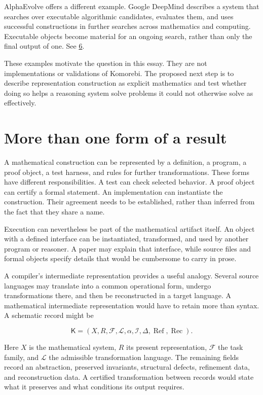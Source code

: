 \documentclass[11pt,oneside,openany]{book}
\begin{document}
AlphaEvolve offers a different example. Google DeepMind describes a system that searches over executable algorithmic candidates, evaluates them, and uses successful constructions in further searches across mathematics and computing. Executable objects become material for an ongoing search, rather than only the final output of one. See \hyperlink{reference-6}{6}.

These examples motivate the question in this essay. They are not implementations or validations of Komorebi. The proposed next step is to describe representation construction as explicit mathematics and test whether doing so helps a reasoning system solve problems it could not otherwise solve as effectively.

\section{More than one form of a result}
A mathematical construction can be represented by a definition, a program, a proof object, a test harness, and rules for further transformations. These forms have different responsibilities. A test can check selected behavior. A proof object can certify a formal statement. An implementation can instantiate the construction. Their agreement needs to be established, rather than inferred from the fact that they share a name.

Execution can nevertheless be part of the mathematical artifact itself. An object with a defined interface can be instantiated, transformed, and used by another program or reasoner. A paper may explain that interface, while source files and formal objects specify details that would be cumbersome to carry in prose.

A compiler's intermediate representation provides a useful analogy. Several source languages may translate into a common operational form, undergo transformations there, and then be reconstructed in a target language. A mathematical intermediate representation would have to retain more than syntax. A schematic record might be

\[
\mathsf K=(X,R,\mathcal F,\mathcal L,\alpha,\mathcal I,
\Delta,\operatorname{Ref},\operatorname{Rec}).
\]

Here \(X\) is the mathematical system, \(R\) its present representation, \(\mathcal F\) the task family, and \(\mathcal L\) the admissible transformation language. The remaining fields record an abstraction, preserved invariants, structural defects, refinement data, and reconstruction data. A certified transformation between records would state what it preserves and what conditions its output requires.
\end{document}
